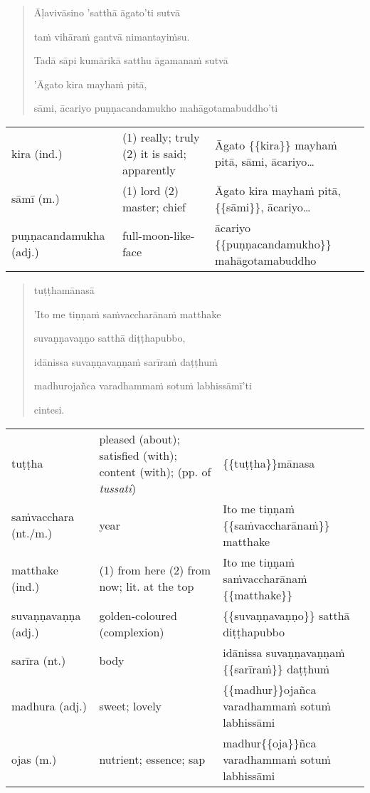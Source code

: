 \documentclass[11pt,oneside]{memoir}
\begin{document}

\clearpage

\begin{quote}
Āḷavivāsino 'satthā āgato'ti sutvā

taṁ vihāraṁ gantvā nimantayiṁsu.

Tadā sāpi kumārikā satthu āgamanaṁ sutvā

'Āgato kira mayhaṁ pitā,

sāmi, ācariyo puṇṇacandamukho mahāgotamabuddho'ti
\end{quote}

\begin{longtable}{L{\colOne} L{\colTwo} H}
kira (ind.) & (1) really; truly (2) it is said; apparently & Āgato \{\{kira\}\} mayhaṁ pitā, sāmi, ācariyo\ldots{}\\[0pt]
sāmī (m.) & (1) lord (2) master; chief & Āgato kira mayhaṁ pitā, \{\{sāmi\}\}, ācariyo\ldots{}\\[0pt]
puṇṇacandamukha (adj.) & full-moon-like-face & ācariyo \{\{puṇṇacandamukho\}\} mahāgotamabuddho\\[0pt]
\end{longtable}


\clearpage

\begin{quote}
tuṭṭhamānasā

'Ito me tiṇṇaṁ saṁvaccharānaṁ matthake

suvaṇṇavaṇṇo satthā diṭṭhapubbo,

idānissa suvaṇṇavaṇṇaṁ sarīraṁ daṭṭhuṁ

madhurojañca varadhammaṁ sotuṁ labhissāmī'ti

cintesi.
\end{quote}

\begin{longtable}{L{\colOne} L{\colTwo} H}
tuṭṭha & pleased (about); satisfied (with); content (with); (pp. of \emph{tussati}) & \{\{tuṭṭha\}\}mānasa\\[0pt]
saṁvacchara (nt./m.) & year & Ito me tiṇṇaṁ \{\{saṁvaccharānaṁ\}\} matthake\\[0pt]
matthake (ind.) & (1) from here (2) from now; lit. at the top & Ito me tiṇṇaṁ saṁvaccharānaṁ \{\{matthake\}\}\\[0pt]
suvaṇṇavaṇṇa (adj.) & golden-coloured (complexion) & \{\{suvaṇṇavaṇṇo\}\} satthā diṭṭhapubbo\\[0pt]
sarīra (nt.) & body & idānissa suvaṇṇavaṇṇaṁ \{\{sarīraṁ\}\} daṭṭhuṁ\\[0pt]
madhura (adj.) & sweet; lovely & \{\{madhur\}\}ojañca varadhammaṁ sotuṁ labhissāmi\\[0pt]
ojas (m.) & nutrient; essence; sap & madhur\{\{oja\}\}ñca varadhammaṁ sotuṁ labhissāmi\\[0pt]
\end{longtable}
\end{document}

